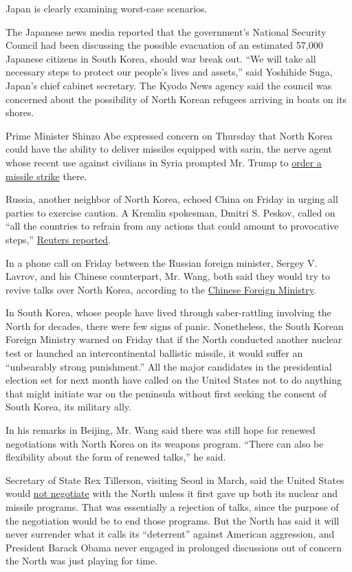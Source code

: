 Japan is clearly examining worst-case scenarios.

The Japanese news media reported that the government's National Security
Council had been discussing the possible evacuation of an estimated
57,000 Japanese citizens in South Korea, should war break out. ``We will
take all necessary steps to protect our people's lives and assets,''
said Yoshihide Suga, Japan's chief cabinet secretary. The Kyodo News
agency said the council was concerned about the possibility of North
Korean refugees arriving in boats on its shores.

Prime Minister Shinzo Abe expressed concern on Thursday that North Korea
could have the ability to deliver missiles equipped with sarin, the
nerve agent whose recent use against civilians in Syria prompted Mr.
Trump to
\href{https://www.nytimes.com/2017/04/07/us/politics/syria-strike-trump-timeline.html}{order
a missile strike} there.

Russia, another neighbor of North Korea, echoed China on Friday in
urging all parties to exercise caution. A Kremlin spokesman, Dmitri S.
Peskov, called on ``all the countries to refrain from any actions that
could amount to provocative steps,''
\href{http://www.reuters.com/article/us-northkorea-russia-idUSKBN17G0RB}{Reuters
reported}.

In a phone call on Friday between the Russian foreign minister, Sergey
V. Lavrov, and his Chinese counterpart, Mr. Wang, both said they would
try to revive talks over North Korea, according to the
\href{http://www.mfa.gov.cn/web/zyxw/t1453861.shtml}{Chinese Foreign
Ministry}.

In South Korea, whose people have lived through saber-rattling involving
the North for decades, there were few signs of panic. Nonetheless, the
South Korean Foreign Ministry warned on Friday that if the North
conducted another nuclear test or launched an intercontinental ballistic
missile, it would suffer an ``unbearably strong punishment.'' All the
major candidates in the presidential election set for next month have
called on the United States not to do anything that might initiate war
on the peninsula without first seeking the consent of South Korea, its
military ally.

In his remarks in Beijing, Mr. Wang said there was still hope for
renewed negotiations with North Korea on its weapons program. ``There
can also be flexibility about the form of renewed talks,'' he said.

Secretary of State Rex Tillerson, visiting Seoul in March, said the
United States would
\href{https://www.nytimes.com/2017/03/17/world/asia/rex-tillerson-north-korea-nuclear.html}{not
negotiate} with the North unless it first gave up both its nuclear and
missile programs. That was essentially a rejection of talks, since the
purpose of the negotiation would be to end those programs. But the North
has said it will never surrender what it calls its ``deterrent'' against
American aggression, and President Barack Obama never engaged in
prolonged discussions out of concern the North was just playing for
time.

